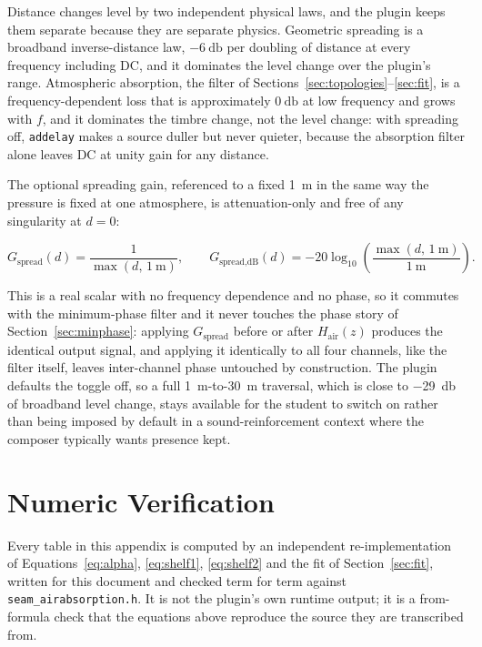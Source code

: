 \documentclass[11pt,a4paper]{article}
\begin{document}
Distance changes level by two independent physical laws, and the plugin keeps them separate because they are separate physics.
Geometric spreading is a broadband inverse-distance law, $\SI{-6}{\decibel}$ per doubling of distance at every frequency including DC, and it dominates the level change over the plugin's range.
Atmospheric absorption, the filter of Sections~\ref{sec:topologies}--\ref{sec:fit}, is a frequency-dependent loss that is approximately $\SI{0}{\decibel}$ at low frequency and grows with $f$, and it dominates the timbre change, not the level change: with spreading off, \texttt{addelay} makes a source duller but never quieter, because the absorption filter alone leaves DC at unity gain for any distance.

The optional spreading gain, referenced to a fixed \SI{1}{\meter} in the same way the pressure is fixed at one atmosphere, is attenuation-only and free of any singularity at $d=0$:

\begin{equation}
G_\text{spread}(d) = \frac{1}{\max(d,\,\SI{1}{\meter})} ,
\qquad
G_\text{spread,dB}(d) = -20\log_{10}\!\left(\frac{\max(d,\,\SI{1}{\meter})}{\SI{1}{\meter}}\right) .
\end{equation}

This is a real scalar with no frequency dependence and no phase, so it commutes with the minimum-phase filter and it never touches the phase story of Section~\ref{sec:minphase}: applying $G_\text{spread}$ before or after $H_\text{air}(z)$ produces the identical output signal, and applying it identically to all four channels, like the filter itself, leaves inter-channel phase untouched by construction.
The plugin defaults the toggle off, so a full \SI{1}{\meter}-to-\SI{30}{\meter} traversal, which is close to \SI{-29}{\decibel} of broadband level change, stays available for the student to switch on rather than being imposed by default in a sound-reinforcement context where the composer typically wants presence kept.

\appendix

\section{Numeric Verification}
\label{app:numeric}

Every table in this appendix is computed by an independent re-implementation of Equations~\eqref{eq:alpha}, \eqref{eq:shelf1}, \eqref{eq:shelf2} and the fit of Section~\ref{sec:fit}, written for this document and checked term for term against \texttt{seam\_airabsorption.h}.
It is not the plugin's own runtime output; it is a from-formula check that the equations above reproduce the source they are transcribed from.
\end{document}
